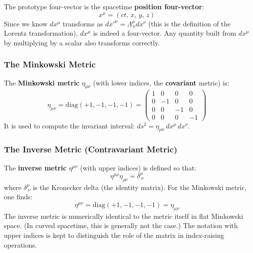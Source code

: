 The prototype four-vector is the spacetime \textbf{position four-vector}:
\begin{equation}\label{eq:lec05:position-four-vector}
    x^\mu = (ct,\, x,\, y,\, z)
\end{equation}
Since we know $dx^\mu$ transforms as $dx'^\mu = \Lambda^\mu_{\ \nu} dx^\nu$ (this is the definition of the Lorentz transformation), $dx^\mu$ is indeed a four-vector. Any quantity built from $dx^\mu$ by multiplying by a scalar also transforms correctly.

\subsubsection*{The Minkowski Metric}

The \textbf{Minkowski metric} $\eta_{\mu\nu}$ (with lower indices, the \textbf{covariant} metric) is:
\begin{equation}\label{eq:lec05:minkowski-metric}
    \eta_{\mu\nu} = \text{diag}(+1, -1, -1, -1) =
    \begin{pmatrix} 1 & 0 & 0 & 0 \\ 0 & -1 & 0 & 0 \\ 0 & 0 & -1 & 0 \\ 0 & 0 & 0 & -1 \end{pmatrix}
\end{equation}
It is used to compute the invariant interval: $ds^2 = \eta_{\mu\nu}\,dx^\mu\,dx^\nu$.

\subsubsection*{The Inverse Metric (Contravariant Metric)}

The \textbf{inverse metric} $\eta^{\mu\nu}$ (with upper indices) is defined so that:
\begin{equation}\label{eq:lec05:inverse-metric-definition}
    \eta^{\mu\rho}\eta_{\rho\nu} = \delta^\mu_{\ \nu}
\end{equation}
where $\delta^\mu_{\ \nu}$ is the Kronecker delta (the identity matrix). For the Minkowski metric, one finds:
\begin{equation}\label{eq:lec05:inverse-metric}
    \eta^{\mu\nu} = \text{diag}(+1, -1, -1, -1) = \eta_{\mu\nu}
\end{equation}
The inverse metric is numerically identical to the metric itself in flat Minkowski space. (In curved spacetime, this is generally not the case.) The notation with upper indices is kept to distinguish the role of the matrix in index-raising operations.

